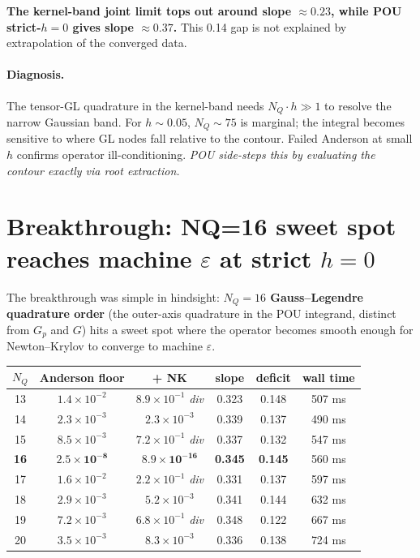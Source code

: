 \documentclass[11pt]{article}
\begin{document}
\textbf{The kernel-band joint limit tops out around slope $\approx 0.23$,
while POU strict-$h{=}0$ gives slope $\approx 0.37$.} This 0.14 gap is
not explained by extrapolation of the converged data.

\paragraph{Diagnosis.} The tensor-GL quadrature in the kernel-band
needs $N_{Q} \cdot h \gg 1$ to resolve the narrow Gaussian band. For
$h \sim 0.05$, $N_Q \sim 75$ is marginal; the integral becomes
sensitive to where GL nodes fall relative to the contour. Failed
Anderson at small $h$ confirms operator ill-conditioning. \emph{POU
side-steps this by evaluating the contour exactly via root extraction.}

\section{Breakthrough: NQ=16 sweet spot reaches machine $\varepsilon$ at strict $h=0$}

The breakthrough was simple in hindsight: \textbf{$N_Q = 16$ Gauss--Legendre
quadrature order} (the outer-axis quadrature in the POU integrand,
distinct from $G_p$ and $G$) hits a sweet spot where the operator
becomes smooth enough for Newton--Krylov to converge to machine
$\varepsilon$.

\begin{center}
\begin{tabular}{cccccc}
\toprule
$N_Q$ & Anderson floor & + NK & slope & deficit & wall time \\
\midrule
13 & $1.4\!\times\!10^{-2}$ & $8.9\!\times\!10^{-1}$ \emph{div} & 0.323 & 0.148 & 507 ms \\
14 & $2.3\!\times\!10^{-3}$ & $2.3\!\times\!10^{-3}$ & 0.339 & 0.137 & 490 ms \\
15 & $8.5\!\times\!10^{-3}$ & $7.2\!\times\!10^{-1}$ \emph{div} & 0.337 & 0.132 & 547 ms \\
\textbf{16} & $\mathbf{2.5\!\times\!10^{-8}}$ & $\mathbf{8.9\!\times\!10^{-16}}$ & \textbf{0.345} & \textbf{0.145} & 560 ms \\
17 & $1.6\!\times\!10^{-2}$ & $2.2\!\times\!10^{-1}$ \emph{div} & 0.331 & 0.137 & 597 ms \\
18 & $2.9\!\times\!10^{-3}$ & $5.2\!\times\!10^{-3}$ & 0.341 & 0.144 & 632 ms \\
19 & $7.2\!\times\!10^{-3}$ & $6.8\!\times\!10^{-1}$ \emph{div} & 0.348 & 0.122 & 667 ms \\
20 & $3.5\!\times\!10^{-3}$ & $8.3\!\times\!10^{-3}$ & 0.336 & 0.138 & 724 ms \\
\bottomrule
\end{tabular}
\end{center}
\end{document}
